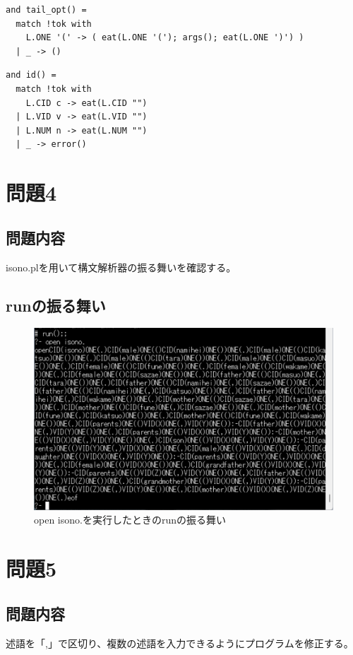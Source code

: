 \documentclass{ltjsarticle}
\begin{document}
\begin{lstlisting}[caption = tail\_opt]
and tail_opt() =
  match !tok with
    L.ONE '(' -> ( eat(L.ONE '('); args(); eat(L.ONE ')') )
  | _ -> ()
\end{lstlisting}

\begin{lstlisting}[caption = id]
and id() =
  match !tok with
    L.CID c -> eat(L.CID "")
  | L.VID v -> eat(L.VID "")
  | L.NUM n -> eat(L.NUM "")
  | _ -> error()
\end{lstlisting}

\section{問題4}
\subsection{問題内容}
isono.plを用いて構文解析器の振る舞いを確認する。
\subsection{runの振る舞い}
\begin{figure}[htbp]
  \centering
  \caption{open isono.を実行したときのrunの振る舞い}
  \label{fig:run_isono}
  \includegraphics[scale = 0.6]{parser_run.png}
\end{figure}

\section{問題5}
\subsection{問題内容}
述語を「,」で区切り、複数の述語を入力できるようにプログラムを修正する。
\end{document}
